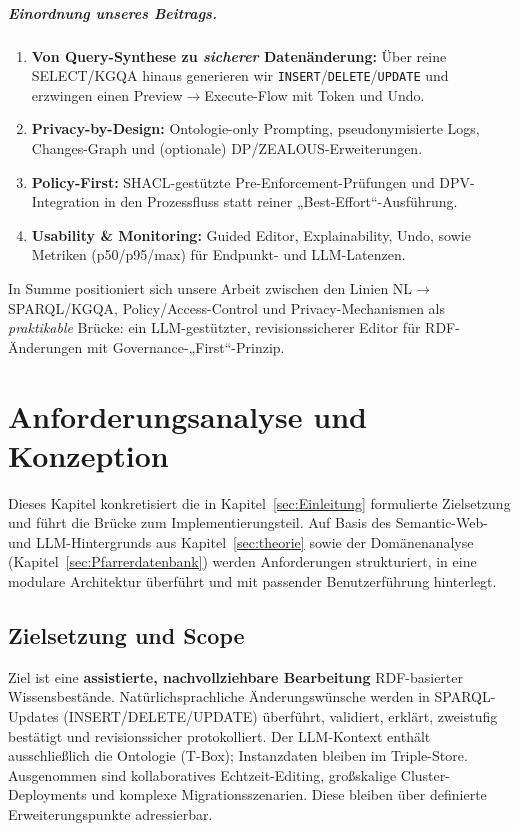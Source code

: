\paragraph{Einordnung unseres Beitrags.}
\begin{enumerate}
  \item \textbf{Von Query-Synthese zu \emph{sicherer} Datenänderung:} Über reine SELECT/KGQA hinaus generieren wir \texttt{INSERT}/\texttt{DELETE}/\texttt{UPDATE} und erzwingen einen Preview{\(\rightarrow\)}Execute-Flow mit Token und Undo.
  \item \textbf{Privacy-by-Design:} Ontologie-only Prompting, pseudonymisierte Logs, Changes-Graph und (optionale) DP/ZEALOUS-Erweiterungen.
  \item \textbf{Policy-First:} SHACL-gestützte Pre-Enforcement-Prüfungen und DPV-Integration in den Prozessfluss statt reiner „Best-Effort“-Ausführung.
  \item \textbf{Usability \& Monitoring:} Guided Editor, Explainability, Undo, sowie Metriken (p50/p95/max) für Endpunkt- und LLM-Latenzen.
\end{enumerate}
In Summe positioniert sich unsere Arbeit zwischen den Linien NL{\(\rightarrow\)}SPARQL/KGQA, Policy/Access-Control und Privacy-Mechanismen als \emph{praktikable} Brücke: ein LLM-gestützter, revisionssicherer Editor für RDF-Änderungen mit Governance-„First“-Prinzip.





\chapter{Anforderungsanalyse und Konzeption}
\label{sec:konzeption}

Dieses Kapitel konkretisiert die in Kapitel~\ref{sec:Einleitung} formulierte Zielsetzung und führt die Brücke zum Implementierungsteil. Auf Basis des Semantic-Web- und LLM-Hintergrunds aus Kapitel~\ref{sec:theorie} sowie der Domänenanalyse (Kapitel~\ref{sec:Pfarrerdatenbank}) werden Anforderungen strukturiert, in eine modulare Architektur überführt und mit passender Benutzerführung hinterlegt.

\section{Zielsetzung und Scope}
Ziel ist eine \textbf{assistierte, nachvollziehbare Bearbeitung} RDF-basierter Wissensbestände. Natürlichsprachliche Änderungswünsche werden in SPARQL-Updates (INSERT/DELETE/UPDATE) überführt, validiert, erklärt, zweistufig bestätigt und revisionssicher protokolliert. Der LLM-Kontext enthält ausschließlich die Ontologie (T-Box); Instanzdaten bleiben im Triple-Store. Ausgenommen sind kollaboratives Echtzeit-Editing, großskalige Cluster-Deployments und komplexe Migrationsszenarien. Diese bleiben über definierte Erweiterungspunkte adressierbar.

